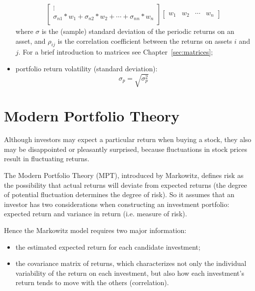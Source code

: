 \begin{itemize}
\begin{equation}
\begin{aligned}
\begin{bmatrix}
  \vdots \\
  \sigma_{n1} *w_1 + \sigma_{n2}*w_2 + \cdots + \sigma_{nn}*w_n \\
  \end{bmatrix}
  \begin{bmatrix}
  w_1 & w_2 & \cdots & w_n
  \end{bmatrix}
  \end{aligned}
  \end{equation}
  where \(\sigma\) is the (sample) standard deviation of the periodic returns on an asset, and \(\rho _{ij}\) is the correlation coefficient between the returns on assets \(i\) and \(j\). For a brief introduction to matrices see Chapter~\ref{sec:matrices};
\item
  portfolio return volatility (standard deviation):
  \begin{equation}
  	\sigma _{p}= \sqrt{\sigma _{p}^{2}}
  \end{equation}
\end{itemize}

\section{Modern Portfolio Theory}
\label{the-markowitz-meanvariance-portfolio-model}

Although investors may expect a particular return when buying a stock, they also may be disappointed or pleasantly surprised, because fluctuations in stock prices result in fluctuating returns. 

The Modern Portfolio Theory (MPT), introduced by Markowitz, defines risk as the possibility that actual returns will deviate from expected returns (the degree of potential fluctuation determines the degree of risk).
So it assumes that an investor has two considerations when constructing an investment portfolio: expected return and variance in return (i.e. measure of risk). 

Hence the Markowitz model requires two major information:

\begin{itemize}
\tightlist
\item the estimated expected return for each candidate investment;
\item the covariance matrix of returns, which characterizes not only the individual variability of the return on each investment, but also how each investment's return tends to move with the others (correlation).
\end{itemize}

